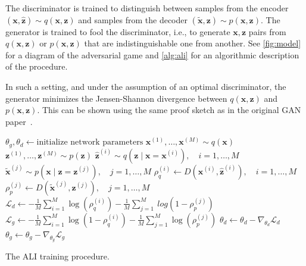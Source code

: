 \documentclass{article}
\begin{document}
The discriminator is trained to distinguish between samples from the encoder
$(\bm{x},\hat{\bm{z}}) \sim q(\bm{x}, \bm{z})$ and samples from the decoder
$(\tilde{\bm{x}}, \bm{z}) \sim p(\bm{x},\bm{z})$. The generator is trained to
fool the discriminator, i.e., to generate $\bm{x}, \bm{z}$ pairs from
$q(\bm{x},\bm{z})$ or $p(\bm{x}, \bm{z})$ that are indistinguishable one from
another. See \autoref{fig:model} for a diagram of the adversarial game and
\autoref{alg:ali} for an algorithmic description of the procedure.

In such a setting, and under the assumption of an optimal discriminator, the
generator minimizes the Jensen-Shannon divergence \citep{lin1991divergence}
between $q(\bm{x}, \bm{z})$ and $p(\bm{x}, \bm{z})$. This can be shown using
the same proof sketch as in the original GAN
paper~\citep{goodfellow2014generative}.

\begin{algorithm}[t]
\begin{algorithmic}
    \State $\theta_{g}, \theta_{d} \gets \text{initialize network parameters}$
    \Repeat
		\State $\bm{x}^{(1)}, \ldots, \bm{x}^{(M)} \sim q(\bm{x})$
		\State $\bm{z}^{(1)}, \ldots, \bm{z}^{(M)} \sim p(\bm{z})$
		\State $\hat{\bm{z}}^{(i)} \sim q(\bm{z} \mid \bm{x} = \bm{x}^{(i)}),
			    \quad i = 1, \ldots, M$
		\State $\tilde{\bm{x}}^{(j)} \sim p(\bm{x} \mid \bm{z} = \bm{z}^{(j)}),
				\quad j = 1, \ldots, M$
        \State $\rho_q^{(i)} \gets D(\bm{x}^{(i)}, \hat{\bm{z}}^{(i)}),
				\quad i = 1, \ldots, M$
        \State $\rho_p^{(j)} \gets D(\tilde{\bm{x}}^{(j)}, \bm{z}^{(j)}),
				\quad j = 1, \ldots, M$
        \State $\mathcal{L}_d \gets
            -\frac{1}{M} \sum_{i=1}^M \log(\rho_q^{(i)})
            -\frac{1}{M} \sum_{j=1}^M\ log(1 - \rho_p^{(j)})$
        \State $\mathcal{L}_g \gets
            -\frac{1}{M} \sum_{i=1}^M \log(1 - \rho_q^{(i)})
            -\frac{1}{M} \sum_{j=1}^M \log(\rho_p^{(j)})$
        \State $\theta_d \gets \theta_d - \nabla_{\theta_d} \mathcal{L}_d$
        \State $\theta_g \gets \theta_g - \nabla_{\theta_g} \mathcal{L}_g$
\end{algorithmic}
\caption{\label{alg:ali} The ALI training procedure.}
\end{algorithm}
\end{document}
